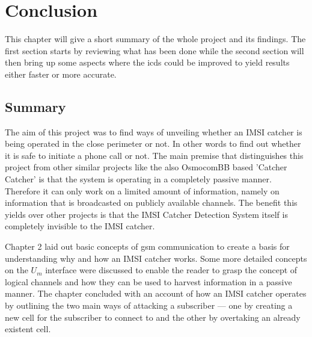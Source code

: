 \chapter{Conclusion}
This chapter will give a short summary of the whole project and its findings.
The first section starts by reviewing what has been done while the second section will then bring up some aspects where the \gls{icds} could be improved to yield results either faster or more accurate.

\section{Summary}
The aim of this project was to find ways of unveiling whether an IMSI catcher is being operated in the close perimeter or not.
In other words to find out whether it is safe to initiate a phone call or not.
The main premise that distinguishes this project from other similar projects like the also  OsmocomBB based 'Catcher Catcher' is that the system is operating in a completely passive manner.
Therefore it can only work on a limited amount of information, namely on information that is broadcasted on publicly available channels.
The benefit this yields over other projects is that the IMSI Catcher Detection System itself is completely invisible to the IMSI catcher.

Chapter 2 laid out basic concepts of \gls{gsm} communication to create a basis for understanding why and how an IMSI catcher works.
Some more detailed concepts on the $U_m$ interface were discussed to enable the reader to grasp the concept of logical channels and how they can be used to harvest information in a passive manner.
The chapter concluded with an account of how an IMSI catcher operates by outlining the two main ways of attacking a subscriber --- one by creating a new cell for the subscriber to connect to and the other by overtaking an already existent cell.

